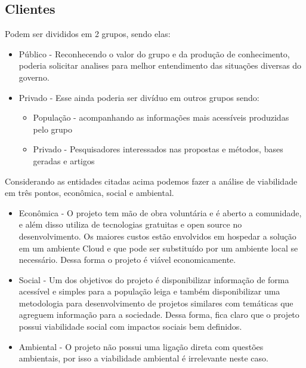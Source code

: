 \documentclass[journal]{IEEEtran}
\begin{document}
\subsection{Clientes}
Podem ser divididos em 2 grupos, sendo elas:
\begin{itemize}
    \item Público - Reconhecendo o valor do grupo e da produção de conhecimento, poderia solicitar analises para melhor entendimento das situações diversas do governo.
    \item Privado - Esse ainda poderia ser divíduo em outros grupos sendo:
    \begin{itemize}
    \item População - acompanhando as informações mais acessíveis produzidas pelo grupo
    \item Privado - Pesquisadores interessados nas propostas e métodos, bases geradas e artigos
    \end{itemize}
\end{itemize}
Considerando as entidades citadas acima podemos fazer a análise de viabilidade em três pontos, econômica, social e ambiental.
\begin{itemize}
    \item Econômica - O projeto tem mão de obra voluntária e é aberto a comunidade, e além disso utiliza de tecnologias gratuitas e open source no desenvolvimento. Os maiores custos estão envolvidos em hospedar a solução em um ambiente Cloud e que pode ser substituído por um ambiente local se necessário. Dessa forma o projeto é viável economicamente.
    \item Social - Um dos objetivos do projeto é disponibilizar informação de forma acessível e simples para a população leiga e também disponibilizar uma metodologia para desenvolvimento de projetos similares com temáticas que agreguem informação para a sociedade. Dessa forma, fica claro que o projeto possui viabilidade social com impactos sociais bem definidos. 
    \item Ambiental - O projeto não possui uma ligação direta com questões ambientais, por isso a viabilidade ambiental é irrelevante neste caso.
\end{itemize}



\end{document}

